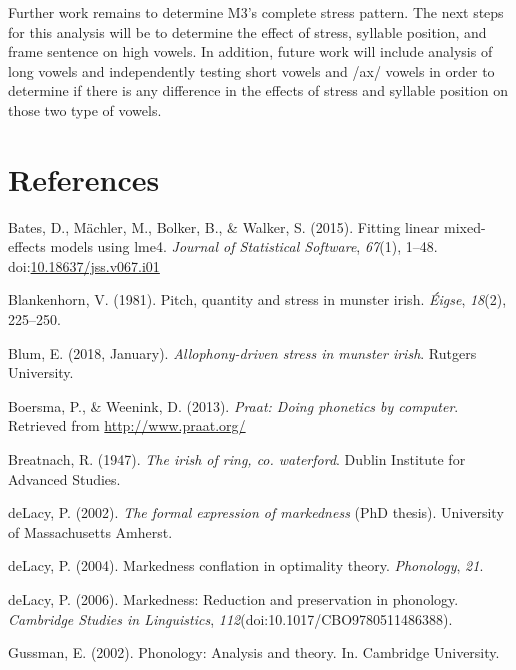 \documentclass[floatsintext,man]{apa6}
\theoremstyle{definition}
\theoremstyle{definition}
\theoremstyle{definition}
\theoremstyle{remark}
\begin{document}
Further work remains to determine M3's complete stress pattern. The next
steps for this analysis will be to determine the effect of stress,
syllable position, and frame sentence on high vowels. In addition,
future work will include analysis of long vowels and independently
testing short vowels and /ax/ vowels in order to determine if there is
any difference in the effects of stress and syllable position on those
two type of vowels.

\newpage

\section{References}\label{references}

\setlength{\parindent}{-0.5in} \setlength{\leftskip}{0.5in}

\hypertarget{refs}{}
\hypertarget{ref-R-lme4}{}
Bates, D., Mächler, M., Bolker, B., \& Walker, S. (2015). Fitting linear
mixed-effects models using lme4. \emph{Journal of Statistical Software},
\emph{67}(1), 1--48.
doi:\href{https://doi.org/10.18637/jss.v067.i01}{10.18637/jss.v067.i01}

\hypertarget{ref-blankenhorn1981}{}
Blankenhorn, V. (1981). Pitch, quantity and stress in munster irish.
\emph{Éigse}, \emph{18}(2), 225--250.

\hypertarget{ref-blum2018}{}
Blum, E. (2018, January). \emph{Allophony-driven stress in munster
irish}. Rutgers University.

\hypertarget{ref-praat}{}
Boersma, P., \& Weenink, D. (2013). \emph{Praat: Doing phonetics by
computer}. Retrieved from \url{http://www.praat.org/}

\hypertarget{ref-breatnach1947}{}
Breatnach, R. (1947). \emph{The irish of ring, co. waterford}. Dublin
Institute for Advanced Studies.

\hypertarget{ref-delacy2002}{}
deLacy, P. (2002). \emph{The formal expression of markedness}
(PhD thesis). University of Massachusetts Amherst.

\hypertarget{ref-delacy2004}{}
deLacy, P. (2004). Markedness conflation in optimality theory.
\emph{Phonology}, \emph{21}.

\hypertarget{ref-delacy2006}{}
deLacy, P. (2006). Markedness: Reduction and preservation in phonology.
\emph{Cambridge Studies in Linguistics},
\emph{112}(doi:10.1017/CBO9780511486388).

\hypertarget{ref-gussman2002}{}
Gussman, E. (2002). Phonology: Analysis and theory. In. Cambridge
University.
\end{document}
